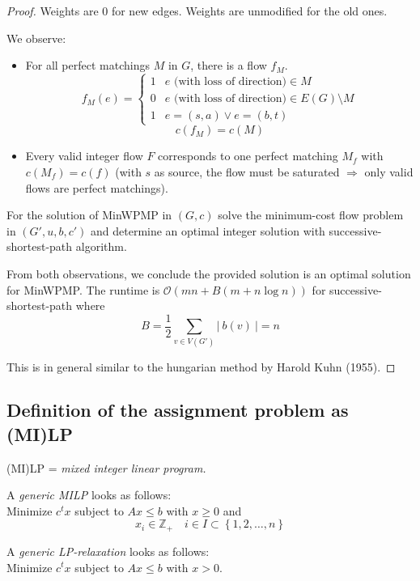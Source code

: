 \documentclass[a4paper]{article}
\theoremstyle{definition}
\newcommand{\card}[1]{\left|\:\!#1\:\!\right|}
\newcommand{\set}[1]{\left\{#1\right\}}
\begin{document}
\begin{proof}
  Weights are 0 for new edges. Weights are unmodified for the old ones.

  We observe:
  \begin{itemize}
    \item For all perfect matchings $M$ in $G$, there is a flow $f_M$.
      \[
        f_M(e) = \begin{cases}
          1 & e \text{ (with loss of direction)} \in M \\
          0 & e \text{ (with loss of direction)} \in E(G) \setminus M \\
          1 & e = (s, a) \lor e = (b, t)
        \end{cases}
      \]
      \[ c(f_M) = c(M) \]

    \item Every valid integer flow $F$ corresponds to one perfect matching $M_f$ with $c(M_f) = c(f)$ (with $s$ as source, the flow must be saturated $\Rightarrow$ only valid flows are perfect matchings).
  \end{itemize}

  For the solution of MinWPMP in $(G, c)$ solve the minimum-cost flow problem in $(G', u, b, c')$ and determine an optimal integer solution with successive-shortest-path algorithm.

  From both observations, we conclude the provided solution is an optimal solution for MinWPMP.
  The runtime is $\mathcal{O}(mn + B(m + n\log{n}))$ for successive-shortest-path where
  \[ B = \frac12 \sum_{v \in V(G')} \card{b(v)} = n \]

  This is in general similar to the hungarian method by Harold Kuhn (1955).
\end{proof}

\subsection{Definition of the assignment problem as (MI)LP}

(MI)LP = \textit{mixed integer linear program.}

\begin{framed}
  A \emph{generic MILP} looks as follows: \\
  Minimize $c^t x$ subject to $Ax \leq b$ with $x \geq 0$ and
  \[ x_i \in \mathbb{Z}_+ \quad i \in I \subset \set{1, 2, \ldots, n} \]
\end{framed}
\begin{framed}
  A \emph{generic LP-relaxation} looks as follows: \\
  Minimize $c^t x$ subject to $Ax \leq b$ with $x > 0$.
\end{framed}
\end{document}
